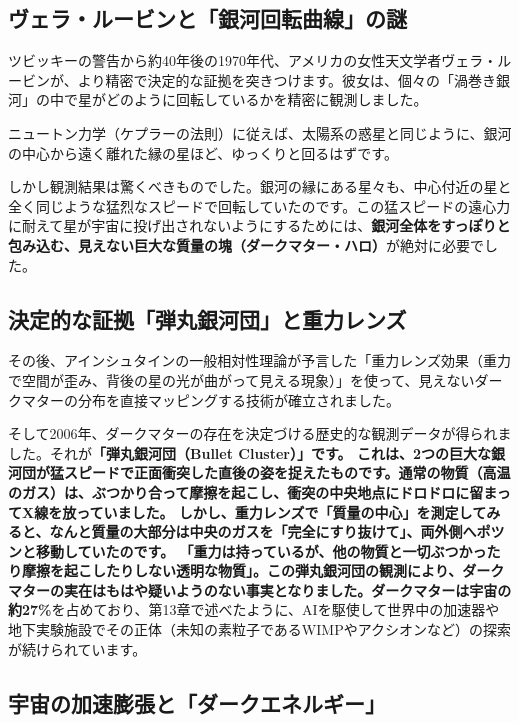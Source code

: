 \subsection{ヴェラ・ルービンと「銀河回転曲線」の謎}

ツビッキーの警告から約40年後の1970年代、アメリカの女性天文学者ヴェラ・ルービンが、より精密で決定的な証拠を突きつけます。彼女は、個々の「渦巻き銀河」の中で星がどのように回転しているかを精密に観測しました。

ニュートン力学（ケプラーの法則）に従えば、太陽系の惑星と同じように、銀河の中心から遠く離れた縁の星ほど、ゆっくりと回るはずです。

しかし観測結果は驚くべきものでした。銀河の縁にある星々も、中心付近の星と全く同じような猛烈なスピードで回転していたのです。この猛スピードの遠心力に耐えて星が宇宙に投げ出されないようにするためには、\textbf{銀河全体をすっぽりと包み込む、見えない巨大な質量の塊（ダークマター・ハロ）}が絶対に必要でした。

\subsection{決定的な証拠「弾丸銀河団」と重力レンズ}

その後、アインシュタインの一般相対性理論が予言した「重力レンズ効果（重力で空間が歪み、背後の星の光が曲がって見える現象）」を使って、見えないダークマターの分布を直接マッピングする技術が確立されました。

そして2006年、ダークマターの存在を決定づける歴史的な観測データが得られました。それが\textbf{「弾丸銀河団（Bullet Cluster）」です。 これは、2つの巨大な銀河団が猛スピードで正面衝突した直後の姿を捉えたものです。通常の物質（高温のガス）は、ぶつかり合って摩擦を起こし、衝突の中央地点にドロドロに留まってX線を放っていました。 しかし、重力レンズで「質量の中心」を測定してみると、なんと質量の大部分は中央のガスを「完全にすり抜けて」、両外側へポツンと移動していたのです。 「重力は持っているが、他の物質と一切ぶつかったり摩擦を起こしたりしない透明な物質」。この弾丸銀河団の観測により、ダークマターの実在はもはや疑いようのない事実となりました。ダークマターは宇宙の約27\%}を占めており、第13章で述べたように、AIを駆使して世界中の加速器や地下実験施設でその正体（未知の素粒子であるWIMPやアクシオンなど）の探索が続けられています。

\subsection{宇宙の加速膨張と「ダークエネルギー」}

